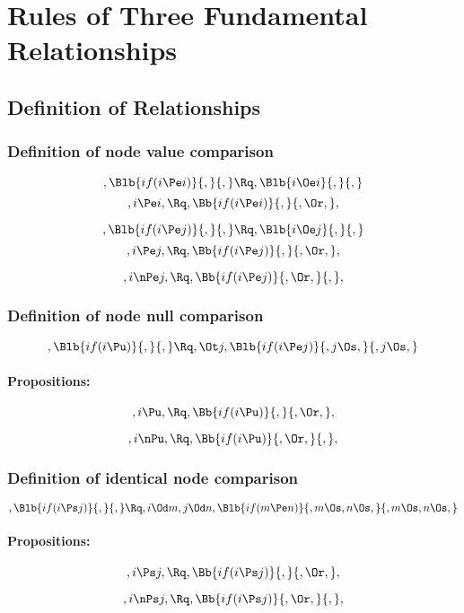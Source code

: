 
\chapter{Rules of Three Fundamental Relationships}

\section{Definition of Relationships}

\subsection{Definition of node value comparison}
\[, \Blb{if(i \Pe i)}{,}{,} \Rq , \Blb{i \Oe i}{,}{,}\]
\bigskip
\[,i \Pe i, \Rq ,\Bb{if(i \Pe i)}{,}{,\Or,},\]

\bigskip
\bigskip

\[, \Blb{if(i \Pe j)}{,}{,} \Rq , \Blb{i \Oe j}{,}{,}\]
\bigskip
\[,i \Pe j, \Rq ,\Bb{if(i \Pe j)}{,}{,\Or,},\]

\[,i \nPe j, \Rq ,\Bb{if(i \Pe j)}{,\Or,}{,},\]



\newpage
\subsection{Definition of node null comparison}
\[, \Blb{if(i \Pu )}{,}{,} \Rq , \Ot j, \Blb{if(i \Pe j)}{,j \Os,}{,j \Os,}\]
\bigskip
\subsubsection{Propositions:}
\[,i \Pu , \Rq ,\Bb{if(i \Pu)}{,}{,\Or,},\]

\[,i \nPu , \Rq ,\Bb{if(i \Pu)}{,\Or,}{,},\]


\bigskip
\bigskip
\bigskip
\bigskip
\subsection{Definition of identical node comparison}
\[, \Blb{if(i \Ps j)}{,}{,} \Rq ,i \Od m ,j \Od n, \Blb{if(m \Pe n)}{,m \Os,n \Os,}{,m \Os,n \Os,}\]
\bigskip
\subsubsection{Propositions:}
\[,i \Ps j , \Rq ,\Bb{if(i \Ps j)}{,}{,\Or,},\]

\[,i \nPs j , \Rq ,\Bb{if(i \Ps j)}{,\Or,}{,},\]

\newpage





